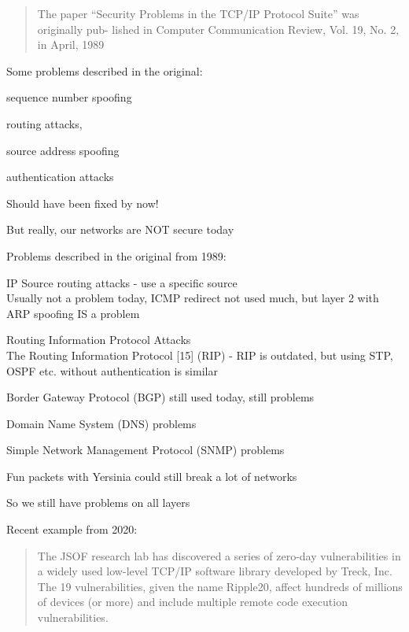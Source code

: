 \documentclass[Screen16to9,17pt]{foils}
\begin{document}

\begin{quote}
The paper “Security Problems in the TCP/IP Protocol Suite” was originally pub-
lished in Computer Communication Review, Vol. 19, No. 2, in April, 1989
\end{quote}

\begin{list1}
\item Some problems described in the original:
\item sequence number spoofing
\item routing attacks,
\item source address spoofing
\item authentication attacks
\end{list1}

\vskip 1cm
\centerline{\Large Should have been fixed by now!}

But really, our networks are NOT secure today


\begin{list1}
\item Problems described in the original from 1989:
\begin{list2}
\item IP Source routing attacks - use a specific source\\
Usually not a problem today, ICMP redirect not used much, but layer 2 with ARP spoofing IS a problem
\item Routing Information Protocol Attacks\\
The Routing Information Protocol [15] (RIP) - RIP is outdated, but using STP, OSPF etc. without authentication is similar
\item Border Gateway Protocol (BGP) still used today, still problems
\item Domain Name System (DNS) problems
\item Simple Network Management Protocol (SNMP) problems
\end{list2}
\vskip 1cm
\item Fun packets with Yersinia could still break a lot of networks 
\end{list1}

\centerline{\Large So we still have problems on all layers}


Recent example from 2020:
\begin{quote}
The JSOF research lab has discovered a series of zero-day vulnerabilities in a widely used low-level TCP/IP software library developed by Treck, Inc. The 19 vulnerabilities, given the name Ripple20, affect hundreds of millions of devices (or more) and include multiple remote code execution vulnerabilities.
\end{quote}
\end{document}
